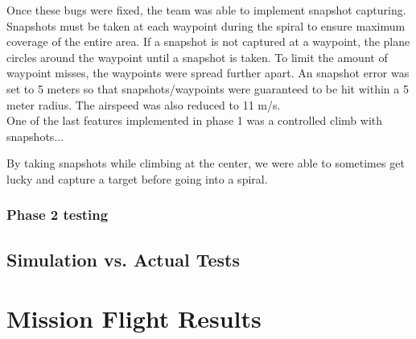 \documentclass[11pt]{article}
\begin{document}
	Once these bugs were fixed, the team was able to implement snapshot capturing. Snapshots must be taken at each waypoint during the spiral to ensure maximum coverage of the entire area. If a snapshot is not captured at a waypoint, the plane circles around the waypoint until a snapshot is taken. To limit the amount of waypoint misses, the waypoints were spread further apart. An snapshot error was set to 5 meters so that snapshots/waypoints were guaranteed to be hit within a 5 meter radius. The airspeed was also reduced to 11 m/s.\\

	One of the last features implemented in phase 1 was a controlled climb with snapshots...


By taking snapshots while climbing at the center, we were able to sometimes get lucky and capture a target before going into a spiral.

\subsubsection{Phase 2 testing}

\subsection{Simulation vs. Actual Tests}
\label{simvsact}



\section{Mission Flight Results}
	\label{MissionFlightResults}
\end{document}
